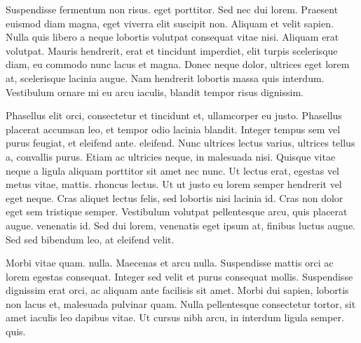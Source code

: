 
 Suspendisse fermentum non risus. eget porttitor. Sed nec dui lorem. Praesent euismod diam magna, eget viverra elit suscipit non. Aliquam et velit sapien. Nulla quis libero a neque lobortis volutpat consequat vitae nisi. Aliquam erat volutpat. Mauris hendrerit, erat et tincidunt imperdiet, elit turpis scelerisque diam, eu commodo nunc lacus et magna. Donec neque dolor, ultrices eget lorem at, scelerisque lacinia augue. Nam hendrerit lobortis massa quis interdum. Vestibulum ornare mi eu arcu iaculis, blandit tempor risus dignissim.

Phasellus elit orci, consectetur et tincidunt et, ullamcorper eu justo. Phasellus placerat accumsan leo, et tempor odio lacinia blandit. Integer tempus sem vel purus feugiat, et eleifend ante. eleifend. Nunc ultrices lectus varius, ultrices tellus a, convallis purus. Etiam ac ultricies neque, in malesuada nisi. Quisque vitae neque a ligula aliquam porttitor sit amet nec nunc. Ut lectus erat, egestas vel metus vitae, mattis. rhoncus lectus. Ut ut justo eu lorem semper hendrerit vel eget neque. Cras aliquet lectus felis, sed lobortis nisi lacinia id. Cras non dolor eget sem tristique semper. Vestibulum volutpat pellentesque arcu, quis placerat augue. venenatis id. Sed dui lorem, venenatis eget ipsum at, finibus luctus augue. Sed sed bibendum leo, at eleifend velit.

Morbi vitae quam. nulla. Maecenas et arcu nulla. Suspendisse mattis orci ac lorem egestas consequat. Integer sed velit et purus consequat mollis. Suspendisse dignissim erat orci, ac aliquam ante facilisis sit amet. Morbi dui sapien, lobortis non lacus et, malesuada pulvinar quam. Nulla pellentesque consectetur tortor, sit amet iaculis leo dapibus vitae. Ut cursus nibh arcu, in interdum ligula semper. quis. 





